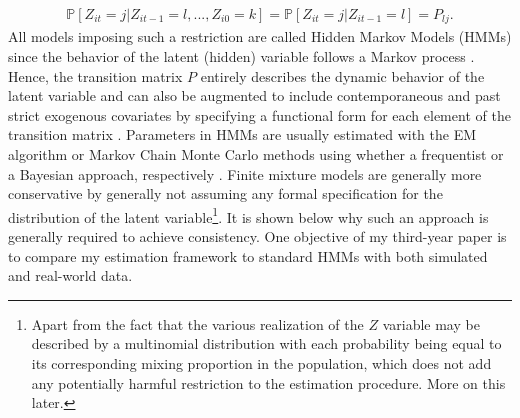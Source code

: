 \documentclass[11pt,letter]{article}
\begin{document}
\begin{align*}
\mathbb{P}[Z_{it} = j|Z_{it-1}=l,...,Z_{i0}=k] = \mathbb{P}[Z_{it} = j|Z_{it-1}=l] = P_{lj}.
\end{align*}
All models imposing such a restriction are called Hidden Markov Models (HMMs) since the behavior of the latent (hidden) variable follows a Markov process \citep{altman_mixed_2007,cappe_inference_2005}. Hence, the transition matrix $P$ entirely describes the dynamic behavior of the latent variable and can also be augmented to include contemporaneous and past strict exogenous covariates by specifying a functional form for each element of the transition matrix \citep{luo_bayesian_2021,hyppolite_alternative_2017}. Parameters in HMMs are usually estimated with the EM algorithm or Markov Chain Monte Carlo methods using whether a frequentist or a Bayesian approach, respectively \citep{luo_bayesian_2021}. Finite mixture models are generally more conservative by generally not assuming any formal specification for the distribution of the latent variable\footnote{Apart from the fact that the various realization of the $Z$ variable may be described by a multinomial distribution with each probability being equal to its corresponding mixing proportion in the population, which does not add any potentially harmful restriction to the estimation procedure. More on this later.}. It is shown below why such an approach is generally required to achieve consistency. One objective of my third-year paper is to compare my estimation framework to standard HMMs with both simulated and real-world data.
\end{document}
